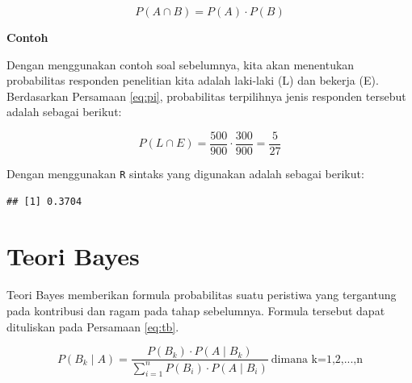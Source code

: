 \documentclass[]{book}
\newenvironment{Shaded}{\begin{snugshade}}{\end{snugshade}}
\newcommand{\KeywordTok}[1]{\textcolor[rgb]{0.13,0.29,0.53}{\textbf{#1}}}
\newcommand{\StringTok}[1]{\textcolor[rgb]{0.31,0.60,0.02}{#1}}
\newcommand{\CommentTok}[1]{\textcolor[rgb]{0.56,0.35,0.01}{\textit{#1}}}
\newcommand{\OperatorTok}[1]{\textcolor[rgb]{0.81,0.36,0.00}{\textbf{#1}}}
\newcommand{\NormalTok}[1]{#1}
\begin{document}
\begin{equation}
   P\left(A\cap B\right)=P\left(A\right)\cdot P\left(B\right)
  \label{eq:pi}
\end{equation}

\textbf{Contoh}

Dengan menggunakan contoh soal sebelumnya, kita akan menentukan
probabilitas responden penelitian kita adalah laki-laki (L) dan bekerja
(E). Berdasarkan Persamaan \eqref{eq:pi}, probabilitas terpilihnya jenis
responden tersebut adalah sebagai berikut:

\[
P\left(L\cap E\right)=\frac{500}{900}\cdot\frac{300}{900}=\frac{5}{27}
\]

Dengan menggunakan \texttt{R} sintaks yang digunakan adalah sebagai
berikut:

\begin{Shaded}
\end{Shaded}

\begin{verbatim}
## [1] 0.3704
\end{verbatim}

\section{Teori Bayes}\label{teori-bayes}

Teori Bayes memberikan formula probabilitas suatu peristiwa yang
tergantung pada kontribusi dan ragam pada tahap sebelumnya. Formula
tersebut dapat dituliskan pada Persamaan \eqref{eq:tb}.

\begin{equation}
   P\left(B_k\mid A\right)=\frac{P\left(B_k\right)\cdot P\left(A\mid B_k\right)}{\sum_{i=1}^nP\left(B_i\right)\cdot P\left(A\mid B_i\right)}\ \text{dimana k=1,2,...,n}
  \label{eq:tb}
\end{equation}
\end{document}
